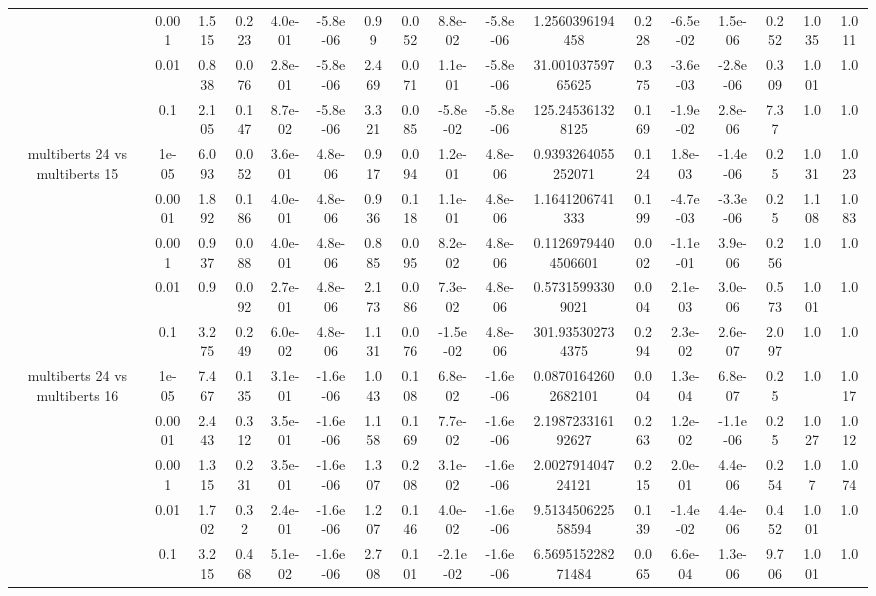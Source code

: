 \begin{tabular}{|c|c|c|c|c|c|c|c|c|c|c|c|c|c|c|c|c|}
 & 0.001 & 1.515 & 0.223 & 4.0e-01 & -5.8e-06 & 0.99 & 0.052 & 8.8e-02 & -5.8e-06 & 1.2560396194458 & 0.228 & -6.5e-02 & 1.5e-06 & 0.252 & 1.035 & 1.011 \\
 & 0.01 & 0.838 & 0.076 & 2.8e-01 & -5.8e-06 & 2.469 & 0.071 & 1.1e-01 & -5.8e-06 & 31.00103759765625 & 0.375 & -3.6e-03 & -2.8e-06 & 0.309 & 1.001 & 1.0 \\
 & 0.1 & 2.105 & 0.147 & 8.7e-02 & -5.8e-06 & 3.321 & 0.085 & -5.8e-02 & -5.8e-06 & 125.245361328125 & 0.169 & -1.9e-02 & 2.8e-06 & 7.37 & 1.0 & 1.0 \\
\hline
\multirow{5}{*}{multiberts 24 vs multiberts 15} & 1e-05 & 6.093 & 0.052 & 3.6e-01 & 4.8e-06 & 0.917 & 0.094 & 1.2e-01 & 4.8e-06 & 0.9393264055252071 & 0.124 & 1.8e-03 & -1.4e-06 & 0.25 & 1.031 & 1.023 \\
 & 0.0001 & 1.892 & 0.186 & 4.0e-01 & 4.8e-06 & 0.936 & 0.118 & 1.1e-01 & 4.8e-06 & 1.1641206741333 & 0.199 & -4.7e-03 & -3.3e-06 & 0.25 & 1.108 & 1.083 \\
 & 0.001 & 0.937 & 0.088 & 4.0e-01 & 4.8e-06 & 0.885 & 0.095 & 8.2e-02 & 4.8e-06 & 0.11269794404506601 & 0.002 & -1.1e-01 & 3.9e-06 & 0.256 & 1.0 & 1.0 \\
 & 0.01 & 0.9 & 0.092 & 2.7e-01 & 4.8e-06 & 2.173 & 0.086 & 7.3e-02 & 4.8e-06 & 0.57315993309021 & 0.004 & 2.1e-03 & 3.0e-06 & 0.573 & 1.001 & 1.0 \\
 & 0.1 & 3.275 & 0.249 & 6.0e-02 & 4.8e-06 & 1.131 & 0.076 & -1.5e-02 & 4.8e-06 & 301.935302734375 & 0.294 & 2.3e-02 & 2.6e-07 & 2.097 & 1.0 & 1.0 \\
\hline
\multirow{5}{*}{multiberts 24 vs multiberts 16} & 1e-05 & 7.467 & 0.135 & 3.1e-01 & -1.6e-06 & 1.043 & 0.108 & 6.8e-02 & -1.6e-06 & 0.08701642602682101 & 0.004 & 1.3e-04 & 6.8e-07 & 0.25 & 1.0 & 1.017 \\
 & 0.0001 & 2.443 & 0.312 & 3.5e-01 & -1.6e-06 & 1.158 & 0.169 & 7.7e-02 & -1.6e-06 & 2.198723316192627 & 0.263 & 1.2e-02 & -1.1e-06 & 0.25 & 1.027 & 1.012 \\
 & 0.001 & 1.315 & 0.231 & 3.5e-01 & -1.6e-06 & 1.307 & 0.208 & 3.1e-02 & -1.6e-06 & 2.002791404724121 & 0.215 & 2.0e-01 & 4.4e-06 & 0.254 & 1.07 & 1.074 \\
 & 0.01 & 1.702 & 0.32 & 2.4e-01 & -1.6e-06 & 1.207 & 0.146 & 4.0e-02 & -1.6e-06 & 9.513450622558594 & 0.139 & -1.4e-02 & 4.4e-06 & 0.452 & 1.001 & 1.0 \\
 & 0.1 & 3.215 & 0.468 & 5.1e-02 & -1.6e-06 & 2.708 & 0.101 & -2.1e-02 & -1.6e-06 & 6.569515228271484 & 0.065 & 6.6e-04 & 1.3e-06 & 9.706 & 1.001 & 1.0 \\

\end{tabular}
